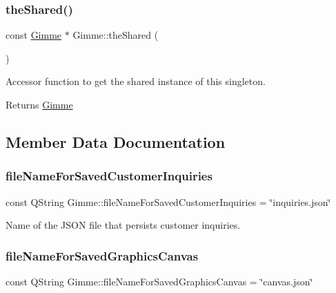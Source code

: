 \subsubsection{\texorpdfstring{theShared()}{theShared()}}
{\footnotesize\ttfamily const \mbox{\hyperlink{class_gimme}{Gimme}} $\ast$ Gimme\+::the\+Shared (\begin{DoxyParamCaption}{ }\end{DoxyParamCaption})\hspace{0.3cm}{\ttfamily [static]}}



Accessor function to get the shared instance of this singleton. 

\begin{DoxyReturn}{Returns}
\mbox{\hyperlink{class_gimme}{Gimme}} 
\end{DoxyReturn}


\subsection{Member Data Documentation}
\mbox{\label{class_gimme_aa9b6e0a689535736ab697a54e40ef5fc}} 
\subsubsection{\texorpdfstring{fileNameForSavedCustomerInquiries}{fileNameForSavedCustomerInquiries}}
{\footnotesize\ttfamily const Q\+String Gimme\+::file\+Name\+For\+Saved\+Customer\+Inquiries = \char`\"{}inquiries.\+json\char`\"{}}

Name of the J\+S\+ON file that persists customer inquiries. \mbox{\label{class_gimme_a75f442cedd5b873cc9982a812ac56c8f}} 
\subsubsection{\texorpdfstring{fileNameForSavedGraphicsCanvas}{fileNameForSavedGraphicsCanvas}}
{\footnotesize\ttfamily const Q\+String Gimme\+::file\+Name\+For\+Saved\+Graphics\+Canvas = \char`\"{}canvas.\+json\char`\"{}}

